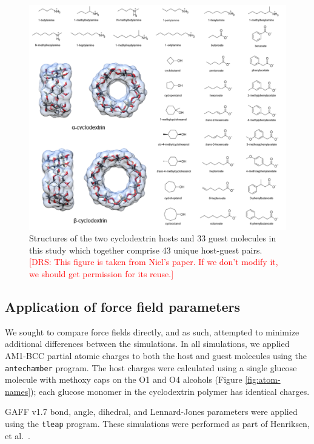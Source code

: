 \documentclass[9pt,lineno]{elife}
\newcommand{\drsnote}[1]{ {\textcolor{red} { [DRS: #1] }}}
\newcommand{\drsnote}[1]{}
\begin{document}
\begin{figure}[tb]
\centering
\includegraphics[width=\textwidth]{images/host-guest-pairs.png}
\caption{Structures of the two cyclodextrin hosts and 33 guest molecules in this study which together comprise 43 unique host-guest pairs. \drsnote{This figure is taken from Niel's paper. If we don't modify it, we should get permission for its reuse.}}
\label{fig:host-guest-pairs}
\end{figure}

\subsection{Application of force field parameters}
We sought to compare force fields directly, and as such, attempted to minimize additional differences between the simulations.
In all simulations, we applied AM1-BCC \cite{jakalian_fast_2000, jakalian_fast_2002} partial atomic charges to both the host and guest molecules using the \texttt{antechamber} program.
The host charges were calculated using a single glucose molecule with methoxy caps on the O1 and O4 alcohols (Figure \ref{fig:atom-names}); each glucose monomer in the cyclodextrin polymer has identical charges.

GAFF v1.7 bond, angle, dihedral, and Lennard-Jones parameters were applied using the \texttt{tleap} program.
These simulations were performed as part of Henriksen, et al.~\cite{henriksen_evaluating_2017}.
\end{document}
